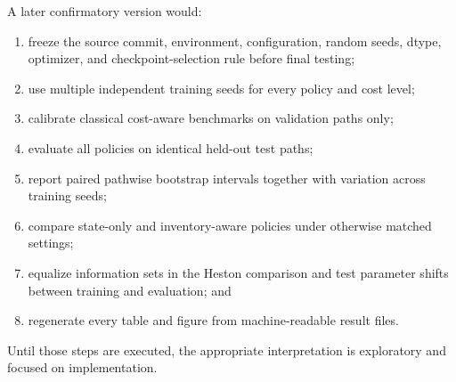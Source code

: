 A later confirmatory version would:

\begin{enumerate}[leftmargin=2em]
  \item freeze the source commit, environment, configuration, random seeds,
  dtype, optimizer, and checkpoint-selection rule before final testing;
  \item use multiple independent training seeds for every policy and cost level;
  \item calibrate classical cost-aware benchmarks on validation paths only;
  \item evaluate all policies on identical held-out test paths;
  \item report paired pathwise bootstrap intervals together with variation
  across training seeds;
  \item compare state-only and inventory-aware policies under otherwise matched
  settings;
  \item equalize information sets in the Heston comparison and test parameter
  shifts between training and evaluation; and
  \item regenerate every table and figure from machine-readable result files.
\end{enumerate}

Until those steps are executed, the appropriate interpretation is exploratory
and focused on implementation.
